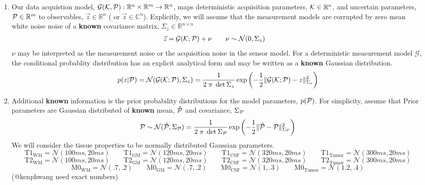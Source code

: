 \documentclass{article}         %
\theoremstyle{definition}
\theoremstyle{remark}
\begin{document}
\begin{enumerate}
  \item Our data acquistion model, $\mathcal{G}(\mathcal{K},\mathcal{P}): \mathbb{R}^a
\times \mathbb{R}^m \rightarrow \mathbb{R}^n $,
maps deterministic acquisition
parameters, $\mathcal{K} \in \mathbb{R}^a$, and uncertain parameters, $\mathcal{P} \in \mathbb{R}^m$
to observables, $\vec{z} \in \mathbb{R}^n$ ( or $\vec{z} \in \mathbb{C}^n$).
Explicitly, we will assume that the
measurement models are corrupted by zero mean white noise noise of a
\textbf{known} covariance matrix, $\Sigma_z \in \mathbb{R}^{n \times n}$ 
\begin{equation}
\label{sensormodelstructure}
\begin{split}
  \vec{z} & = \mathcal{G}(\mathcal{K};\mathcal{P}) + \nu   \qquad   \nu \sim \mathcal{N}(0,\Sigma_z)
     \end{split}
\end{equation}
$\nu$ may be interpreted as the measurement noise or the acquisition noise
in the sensor model. For a deterministic measurement model $\mathcal{G}$,
the conditional probablity distribution has an explicit analytical form
and may be written as a  \textbf{known} Gaussian
distribution. 
  \[ 
      p(z|\mathcal{P})   =  \mathcal{N}(\mathcal{G}(\mathcal{K};\mathcal{P}),\Sigma_z)  
                      =  \frac{1}{2 \; \pi \; \det{\Sigma_z}} \exp\left( - \frac{1}{2} \|\mathcal{G}(\mathcal{K};\mathcal{P})  - z \|^2_{\Sigma_z}\right)
  \]
  \item Additional \textbf{known} information is the prior probability
distributions for the model parameters, $p(\mathcal{P})$.  For simplicity,
    assume that Prior parameters are Gaussian distributed of 
   \textbf{known} mean, $\hat{\mathcal{P}}$ and covariance, $\Sigma_{\mathcal{P}}$
   \[
      \mathcal{P} \sim \mathcal{N} (\hat{\mathcal{P}}, \Sigma_{\mathcal{P}})
                      =  \frac{1}{2 \; \pi \; \det{\Sigma_{\mathcal{P}}}} \exp\left( 
          - \frac{1}{2} \|\hat{\mathcal{P}}  - \mathcal{P} \|^2_{\Sigma_{\mathcal{P}}}
                                                                  \right)
   \]
We will consider the tissue properties to be
normally distributed Gaussian parameters.
\[
  \text{T1}_\text{WM}    =  \mathcal{N}(100ms, 20ms)  \qquad
  \text{T1}_\text{GM}    =  \mathcal{N}(120ms, 20ms)  \qquad
  \text{T1}_\text{CSF}   =  \mathcal{N}(320ms, 20ms)  \qquad
  \text{T1}_\text{Tumor} =  \mathcal{N}(300ms, 20ms)
\]
\[
  \text{T2}_\text{WM}    =  \mathcal{N}(100ms, 20ms)  \qquad
  \text{T2}_\text{GM}    =  \mathcal{N}(120ms, 20ms)  \qquad
  \text{T2}_\text{CSF}   =  \mathcal{N}(320ms, 20ms)  \qquad
  \text{T2}_\text{Tumor} =  \mathcal{N}(300ms, 20ms)
\]
\[
  \text{M0}_\text{WM}    =  \mathcal{N}( .7  ,  .2 )  \qquad
  \text{M0}_\text{GM}    =  \mathcal{N}( .7  ,  .2 )  \qquad
  \text{M0}_\text{CSF}   =  \mathcal{N}(  1  ,  .3 )  \qquad
  \text{M0}_\text{Tumor} =  \mathcal{N}( 1.2 ,  .4 )
\]
{\color{red}(@kenphwang need exact numbers)}


\end{enumerate}
\end{document}
